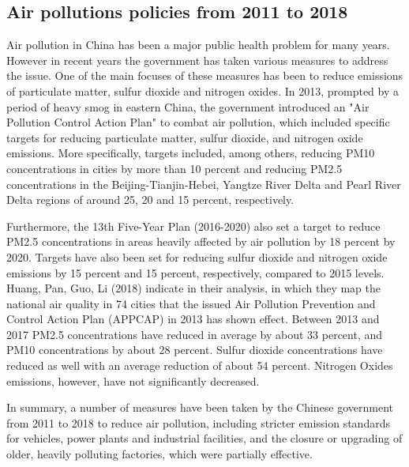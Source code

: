 \documentclass[
]{article}
\begin{document}
\subsection{Air pollutions policies from 2011 to 2018}

Air pollution in China has been a major public health problem for many years. However in recent years the government has taken various measures to address the issue. One of the main focuses of these measures has been to reduce emissions of particulate matter, sulfur dioxide and nitrogen oxides. 
In 2013, prompted by a period of heavy smog in eastern China, the government introduced an "Air Pollution Control Action Plan" to combat air pollution, which included specific targets for reducing particulate matter, sulfur dioxide, and nitrogen oxide emissions. More specifically, targets included, among others, reducing PM10 concentrations in cities by more than 10 percent and reducing PM2.5 concentrations in the Beijing-Tianjin-Hebei, Yangtze River Delta and Pearl River Delta regions of around 25, 20 and 15 percent, respectively. %

Furthermore, the 13th Five-Year Plan (2016-2020) also set a target to reduce PM2.5 concentrations in areas heavily affected by air pollution by 18 percent by 2020. Targets have also been set for reducing sulfur dioxide and nitrogen oxide emissions by 15 percent and 15 percent, respectively, compared to 2015 levels. %
Huang, Pan, Guo, Li (2018) indicate in their analysis, in which they map the national air quality in 74 cities that the issued Air Pollution Prevention and Control Action Plan (APPCAP) in 2013 has shown effect. Between 2013 and 2017 PM2.5 concentrations have reduced in average by about 33 percent, and PM10 concentrations by about 28 percent. Sulfur dioxide concentrations have reduced as well with an average reduction of about 54 percent. Nitrogen Oxides emissions, however, have not significantly decreased. %

In summary, a number of measures have been taken by the Chinese government from 2011 to 2018 to reduce air pollution, including stricter emission standards for vehicles, power plants and industrial facilities, and the closure or upgrading of older, heavily polluting factories, which were partially effective. %
\end{document}
